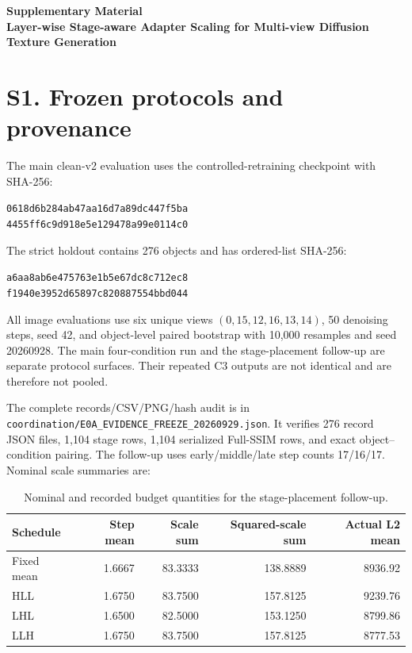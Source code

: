 \documentclass[10pt]{article}
\begin{document}
\begin{center}
{\Large\bfseries Supplementary Material}\\[4pt]
 {\large\bfseries Layer-wise Stage-aware Adapter Scaling for Multi-view Diffusion Texture Generation}
\end{center}

\section{S1. Frozen protocols and provenance}

The main clean-v2 evaluation uses the controlled-retraining checkpoint with
SHA-256:
\begin{center}
\texttt{0618d6b284ab47aa16d7a89dc447f5ba}\\
\texttt{4455ff6c9d918e5e129478a99e0114c0}
\end{center}
The strict holdout contains 276 objects and has ordered-list SHA-256:
\begin{center}
\texttt{a6aa8ab6e475763e1b5e67dc8c712ec8}\\
\texttt{f1940e3952d65897c820887554bbd044}
\end{center}
All image evaluations use six unique views $(0,15,12,16,13,14)$, 50
denoising steps, seed 42, and object-level paired bootstrap with 10,000
resamples and seed 20260928. The main four-condition run and the
stage-placement follow-up are separate protocol surfaces. Their repeated C3
outputs are not identical and are therefore not pooled.

The complete records/CSV/PNG/hash audit is in
\texttt{coordination/E0A\_EVIDENCE\_FREEZE\_20260929.json}. It verifies 276
record JSON files, 1,104 stage rows, 1,104 serialized Full-SSIM rows, and
exact object--condition pairing. The follow-up uses early/middle/late step
counts 17/16/17. Nominal scale summaries are:

\begin{table}[h]
\centering\small
\caption{Nominal and recorded budget quantities for the stage-placement follow-up.}
\begin{tabular}{lrrrr}
\toprule
Schedule & Step mean & Scale sum & Squared-scale sum & Actual L2 mean \\
\midrule
Fixed mean & 1.6667 & 83.3333 & 138.8889 & 8936.92 \\
HLL & 1.6750 & 83.7500 & 157.8125 & 9239.76 \\
LHL & 1.6500 & 82.5000 & 153.1250 & 8799.86 \\
LLH & 1.6750 & 83.7500 & 157.8125 & 8777.53 \\
\bottomrule
\end{tabular}
\end{table}
\end{document}
